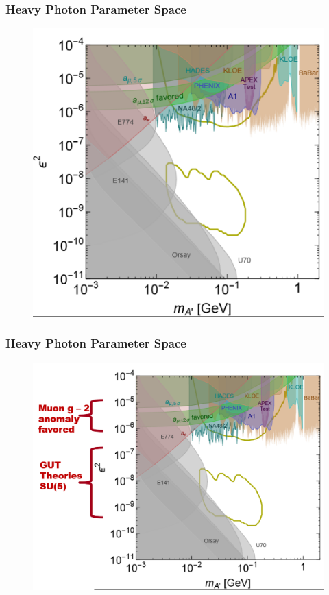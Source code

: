 \documentclass{beamer}
\begin{document}
\begin{frame}
\frametitle{Heavy Photon Parameter Space}
\begin{figure}
\includegraphics[width=0.65\linewidth]{figs/reach1.png}
\end{figure}

\end{frame}


\begin{frame}
\frametitle{Heavy Photon Parameter Space}
\begin{figure}
\includegraphics[width=0.80\linewidth]{figs/reach2.png}
\end{figure}

\end{frame}

\end{document}
